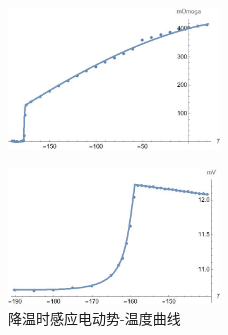 \documentclass[UTF8]{ctexart}
\begin{document}

    \begin{figure}[H] %
        \centering %
        \includegraphics[width=0.5\textwidth]{img/1-1.jpg} %
        \caption{降温时电阻-温度曲线} %
        \label{降温RT} %
    \begin{figure}[H] %
    \end{figure}
        \centering %
        \includegraphics[width=0.5\textwidth]{img/1-2.jpg} %
        \caption{降温时感应电动势-温度曲线} %
        \label{降温UT} %
    \end{figure}
\end{document}
